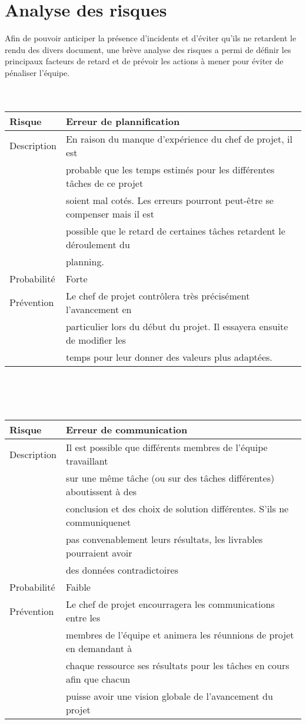 \section{Analyse des risques}
Afin de pouvoir anticiper la présence d'incidents et d'éviter qu'ils ne retardent le rendu des divers document, une brève analyse des risques a permi de définir les principaux facteurs de retard et de prévoir les actions à mener pour éviter de pénaliser l'équipe.
\\
\\~
\\
\begin{tabular}{|l|l|}
\hline Risque & Erreur de plannification \\ \hline
Description & En raison du manque d'expérience du chef de projet, il est \\ 
& probable que les temps estimés pour les différentes tâches de ce projet \\
& soient mal cotés. Les erreurs pourront peut-être se compenser mais il est \\ 
& possible que le retard de certaines tâches retardent le déroulement du \\ 
& planning. \\ \hline
Probabilité & Forte \\ \hline
Prévention & Le chef de projet contrôlera très précisément l'avancement en \\
& particulier lors du début du projet. Il essayera ensuite de modifier les \\ & temps pour leur donner des valeurs plus adaptées. \\ \hline
\end{tabular}
\\
\\~
\\ 
\begin{tabular}{|l|l|}
\hline Risque & Erreur de communication \\ \hline
Description & Il est possible que différents membres de l'équipe travaillant \\
& sur une même tâche (ou sur des tâches différentes) aboutissent à des \\
& conclusion et des choix de solution différentes. S'ils ne communiquenet \\
& pas convenablement leurs résultats, les livrables pourraient avoir \\
& des données contradictoires \\ \hline
Probabilité & Faible \\ \hline
Prévention & Le chef de projet encourragera les communications entre les \\
& membres de l'équipe et animera les réunnions de projet en demandant à \\
& chaque ressource ses résultats pour les tâches en cours afin que chacun \\
& puisse avoir une vision globale de l'avancement du projet \\ \hline 
\end{tabular}

